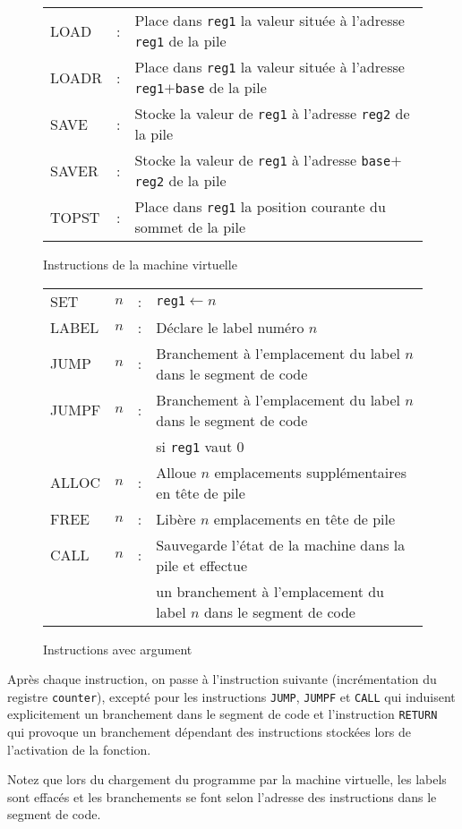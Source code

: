 \documentclass[12pt,a4]{article}
\begin{document}
\begin{figure}
\begin{tabular}{lll}
    LOAD &:& Place dans {\tt reg1} la valeur située à l'adresse {\tt reg1}
    de la pile\\
    LOADR &:& Place dans {\tt reg1} la valeur située à l'adresse
    {\tt reg1}$+${\tt base} de la pile\\
    SAVE &:& Stocke la valeur de {\tt reg1} à l'adresse {\tt reg2} de la pile\\
    SAVER&:& Stocke la valeur de {\tt reg1} à l'adresse {\tt base}$+${\tt reg2} de la pile\\
    TOPST &:& Place dans {\tt reg1} la position courante du sommet de la pile
  \end{tabular}
  
  \caption{Instructions de la machine virtuelle}
  \label{fig:instruct}
\end{figure}

\begin{figure}
  \centering
  \begin{tabular}{llll}
    SET   &$n$&:& {\tt reg1}$\leftarrow n$\\
    LABEL &$n$&:& Déclare le label numéro $n$\\
    JUMP  &$n$&:& Branchement à l'emplacement du label $n$ dans le segment de code\\
    JUMPF &$n$&:& Branchement à l'emplacement du label $n$ dans le segment de code\\
    &&& si {\tt reg1} vaut $0$\\
    ALLOC &$n$&:& Alloue $n$ emplacements supplémentaires en tête de
    pile\\
    FREE  &$n$&:& Libère $n$ emplacements en tête de pile\\
    CALL  &$n$&:& Sauvegarde l'état de la machine dans la pile et effectue \\
    &&& un branchement à l'emplacement du label $n$ dans le segment de code\\
  \end{tabular}
  \caption{Instructions avec argument}
\label{fig:instructarg}
\end{figure}

Après chaque instruction, on passe à l'instruction suivante
(incrémentation du registre {\tt counter}), excepté
pour les instructions {\tt JUMP}, {\tt JUMPF} et {\tt CALL} qui
induisent explicitement un branchement dans le segment de code
et l'instruction {\tt RETURN} qui provoque un branchement dépendant
des instructions stockées lors de l'activation de la fonction.

Notez que lors du chargement du programme par la machine virtuelle,
les labels sont effacés et les branchements se font selon l'adresse
des instructions dans le segment de code.
\end{document}
